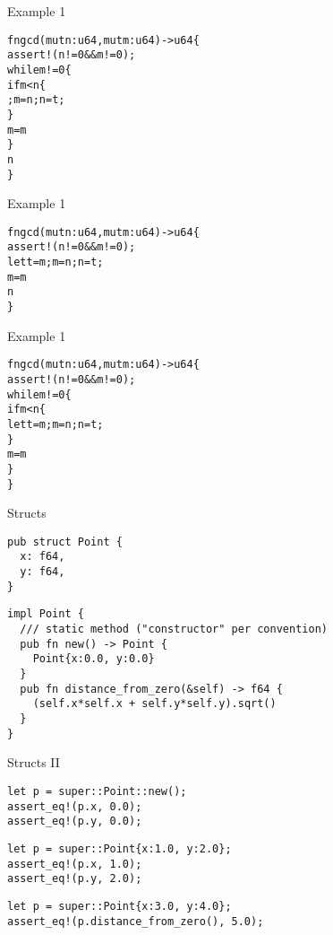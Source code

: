 
\begin{frame}[fragile]{Example 1}
\begin{alltt}
fn gcd(mut n: u64, mut m: u64) -> u64 \{
    assert!(n != 0 && m != 0);
    while m != 0 \{
        if m < n \{
            ; m = n; n = t;
        \}
        m = m % n;
    \}
    n
\}
\end{alltt}
\end{frame}


\begin{frame}[fragile]{Example 1}
\begin{alltt}
fn gcd(mut n: u64, mut m: u64) -> u64 \{
    assert!(n != 0 && m != 0);
            let t = m; m = n; n = t;
        \hi{\}}
        m = m % n;
    \hi{\}}
    n
\}
\end{alltt}
\end{frame}


\begin{frame}[fragile]{Example 1}
\begin{alltt}
fn gcd(mut n: u64, mut m: u64) -> u64 \{
    assert!(n != 0 && m != 0);
    while m != 0 \{
        if m < n \{
            let t = m; m = n; n = t;
        \}
        m = m % n;
    \}
\}
\end{alltt}
\end{frame}


\begin{frame}[fragile]{Structs}
\begin{verbatim}
pub struct Point {
  x: f64,
  y: f64,
}
\end{verbatim}
\pause
\begin{verbatim}
impl Point {
  /// static method ("constructor" per convention)
  pub fn new() -> Point {
    Point{x:0.0, y:0.0}
  }
  pub fn distance_from_zero(&self) -> f64 {
    (self.x*self.x + self.y*self.y).sqrt()
  }
}
\end{verbatim}
\end{frame}

\begin{frame}[fragile]{Structs II}
\begin{verbatim}
let p = super::Point::new();
assert_eq!(p.x, 0.0);
assert_eq!(p.y, 0.0);
\end{verbatim}
\begin{verbatim}
let p = super::Point{x:1.0, y:2.0};
assert_eq!(p.x, 1.0);
assert_eq!(p.y, 2.0);
\end{verbatim}
\begin{verbatim}
let p = super::Point{x:3.0, y:4.0};
assert_eq!(p.distance_from_zero(), 5.0);
\end{verbatim}
\end{frame}

